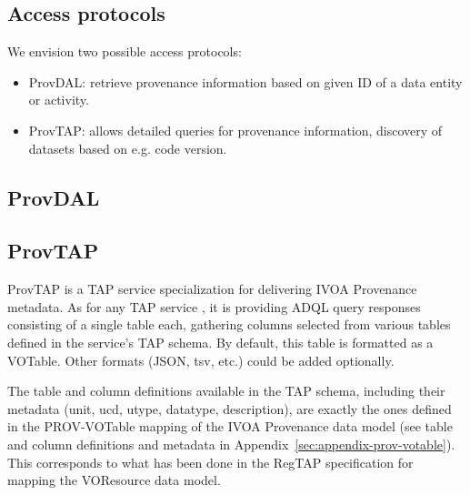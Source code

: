 \subsection{Access protocols}
\label{sec:access_protocols}
We envision two possible access protocols:
\begin{itemize}
\item ProvDAL: retrieve provenance information based on given ID of a data entity or activity.
\item ProvTAP: allows detailed queries for provenance information, discovery of datasets based on e.g. code version.
\end{itemize}

\subsection{ProvDAL}



\subsection{ProvTAP}
ProvTAP is a TAP service specialization for delivering IVOA Provenance metadata.
As for any TAP service \citep{std:TAP}, it is providing ADQL query responses
consisting of a single table each, gathering columns selected from various
tables defined in the service's TAP schema. By default, this table is formatted
as a VOTable. Other formats (JSON, tsv, etc.) could be added optionally.

The table and column definitions available in the TAP schema, including their
metadata (\attribute unit, \attribute ucd, \attribute utype, \attribute datatype, description), are exactly the ones defined
in the PROV-VOTable mapping of the IVOA Provenance data model (see table and
column definitions and metadata in Appendix~\ref{sec:appendix-prov-votable}).
This corresponds to what has been done in the RegTAP specification
\citep{std:RegTAP} for mapping the VOResource data model.

